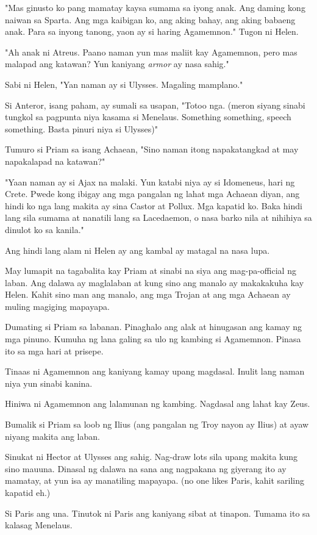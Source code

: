 \documentclass[12pt,letterpaper]{report}
\begin{document}
"Mas ginusto ko pang mamatay kaysa sumama sa iyong anak. Ang daming kong naiwan sa Sparta. Ang mga kaibigan ko,
ang aking bahay, ang aking babaeng anak. Para sa inyong tanong, yaon ay si haring Agamemnon." Tugon ni Helen.

"Ah anak ni Atreus. Paano naman yun mas maliit kay Agamemnon, pero mas malapad ang katawan?
Yun kaniyang \textit{armor} ay nasa sahig."

Sabi ni Helen, "Yan naman ay si Ulysses. Magaling mamplano."

Si Anteror, isang paham, ay sumali sa usapan, "Totoo nga. (meron siyang sinabi tungkol sa pagpunta niya kasama si Menelaus.
Something something, speech something. Basta pinuri niya si Ulysses)"

Tumuro si Priam sa isang Achaean, "Sino naman itong napakatangkad at may napakalapad na katawan?"

"Yaan naman ay si Ajax na malaki. Yun katabi niya ay si Idomeneus, hari ng Crete.
Pwede kong ibigay ang mga pangalan ng lahat mga Achaean diyan, ang hindi ko nga lang makita ay sina Castor at Pollux.
Mga kapatid ko. Baka hindi lang sila sumama at nanatili lang sa Lacedaemon,
o nasa barko nila at nihihiya sa dinulot ko sa kanila."

Ang hindi lang alam ni Helen ay ang kambal ay matagal na nasa lupa.

May lumapit na tagabalita kay Priam at sinabi na siya ang mag-pa-official ng laban.
Ang dalawa ay maglalaban at kung sino ang manalo ay makakakuha kay Helen. Kahit sino man ang manalo,
ang mga Trojan at ang mga Achaean ay muling magiging mapayapa.

Dumating si Priam sa labanan. Pinaghalo ang alak at hinugasan ang kamay ng mga pinuno.
Kumuha ng lana galing sa ulo ng kambing si Agamemnon. Pinasa ito sa mga hari at prisepe.

Tinaas ni Agamemnon ang kaniyang kamay upang magdasal. Inulit lang naman niya yun sinabi kanina.

Hiniwa ni Agamemnon ang lalamunan ng kambing. Nagdasal ang lahat kay Zeus.

Bumalik si Priam sa loob ng Ilius (ang pangalan ng Troy nayon ay Ilius) at ayaw niyang makita ang laban.

Sinukat ni Hector at Ulysses ang sahig. Nag-draw lots sila upang makita kung sino mauuna.
Dinasal ng dalawa na sana ang nagpakana ng giyerang ito ay mamatay, at yun isa ay manatiling mapayapa.
(no one likes Paris, kahit sariling kapatid eh.)

Si Paris ang una. Tinutok ni Paris ang kaniyang sibat at tinapon. Tumama ito sa kalasag Menelaus.
\end{document}
